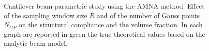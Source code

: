 \begin{figure}
    \quad
    \caption{Cantilever beam parametric study using the AMNA method. Effect of the sampling window size $R$ and of the number of Gauss points $N_{GP}$ on the structural compliance and the volume fraction. In each graph are reported in green the true theoretical values based on the analytic beam model.}%
    \label{fig:cbMNA}%
\end{figure}
\clearpage
